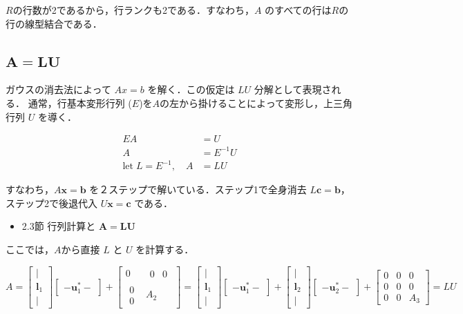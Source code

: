 \documentclass[letterpaper]{article}
\begin{document}
$R$の行数が2であるから，行ランクも2である．すなわち，$A$ のすべての行は$R$の行の線型結合である．

\clearpage

\subsection{$\boldsymbol{A=LU}$}

ガウスの消去法によって $Ax=b$ を解く．この仮定は $LU$ 分解として表現される．
通常，行基本変形行列 ($E$)を$A$の左から掛けることによって変形し，上三角行列 $U$ を導く．

\begin{align*}
  EA &= U\\
  A &= E^{-1}U\\
\text{let} \; L = E^{-1}, \quad  A &= LU
\end{align*}

すなわち，$A\bm{x}=\bm{b}$ を２ステップで解いている．ステップ1で全身消去 $L\bm{c}=\bm{b}$，ステップ2で後退代入 $U\bm{x}=\bm{c}$ である．

\begin{itemize}
  \item 2.3節 行列計算と $\bm{A=LU}$
\end{itemize}

ここでは，$A$から直接 $L$ と $U$ を計算する．

\begin{equation*}
  A = 
      \begin{bmatrix}
        |\\
        \bm{l}_1\\
        |
      \end{bmatrix}
      \begin{bmatrix}
        -  \bm{u}^*_1  -
      \end{bmatrix}
  +  \begin{bmatrix}
      0 & \begin{matrix} 0 & 0 \end{matrix}\\
      \begin{matrix} 0 \\ 0 \end{matrix} & A_2
    \end{bmatrix}
  = 
  \begin{bmatrix}
    |\\
    \bm{l}_1\\
    |
  \end{bmatrix}
  \begin{bmatrix}
    - \bm{u}^*_1 -
  \end{bmatrix}
  +
  \begin{bmatrix}
    |\\
    \bm{l}_2\\
    |
  \end{bmatrix}
  \begin{bmatrix}
    - \bm{u}^*_2  -
  \end{bmatrix}
  +  \begin{bmatrix}
  0 & 0 & 0\\
  0 & 0 & 0 \\
  0 & 0 & A_3
  \end{bmatrix} = LU
\end{equation*}
 
\end{document}
